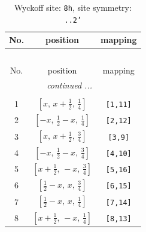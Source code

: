 \documentclass[fleqn,8pt]{jsarticle}
\begin{document}
\begin{longtable}{ccc}
\caption{Wyckoff site: {\tt 8h}, site symmetry: {\tt ..2'}}
 \\
 \hline \hline
No. & position & mapping \\ \hline \endfirsthead

\multicolumn{2}{l}{\tablename\ \thetable{}} \\
 \hline \hline
No. & position & mapping \\ \hline \endhead

 \hline \hline
\multicolumn{2}{r}{\footnotesize\it continued ...} \\ \endfoot

 \hline \hline
\multicolumn{2}{r}{} \\ \endlastfoot

1 & $\left[ x,\, x + \frac{1}{2},\, \frac{1}{4} \right]$ & {\tt [1,11]} \\ \hline
2 & $\left[ - x,\, \frac{1}{2} - x,\, \frac{1}{4} \right]$ & {\tt [2,12]} \\ \hline
3 & $\left[ x,\, x + \frac{1}{2},\, \frac{3}{4} \right]$ & {\tt [3,9]} \\ \hline
4 & $\left[ - x,\, \frac{1}{2} - x,\, \frac{3}{4} \right]$ & {\tt [4,10]} \\ \hline
5 & $\left[ x + \frac{1}{2},\, - x,\, \frac{3}{4} \right]$ & {\tt [5,16]} \\ \hline
6 & $\left[ \frac{1}{2} - x,\, x,\, \frac{3}{4} \right]$ & {\tt [6,15]} \\ \hline
7 & $\left[ \frac{1}{2} - x,\, x,\, \frac{1}{4} \right]$ & {\tt [7,14]} \\ \hline
8 & $\left[ x + \frac{1}{2},\, - x,\, \frac{1}{4} \right]$ & {\tt [8,13]} \\
\end{longtable}
\renewcommand{\arraystretch}{1.2}
\end{document}
